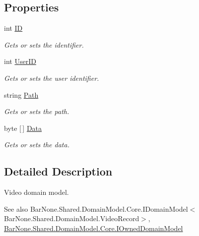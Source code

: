 \subsection*{Properties}
\begin{DoxyCompactItemize}
\item 
int \mbox{\hyperlink{class_bar_none_1_1_shared_1_1_domain_model_1_1_video_record_a89a53536488e59ff9dbd94803b42b68b}{ID}}
\begin{DoxyCompactList}\small\item\em Gets or sets the identifier. \end{DoxyCompactList}\item 
int \mbox{\hyperlink{class_bar_none_1_1_shared_1_1_domain_model_1_1_video_record_a36d21060cce09c7d4e4d116b8ec0ecf2}{User\+ID}}
\begin{DoxyCompactList}\small\item\em Gets or sets the user identifier. \end{DoxyCompactList}\item 
string \mbox{\hyperlink{class_bar_none_1_1_shared_1_1_domain_model_1_1_video_record_aedd2e8a4ce572281a56c6660425c636b}{Path}}
\begin{DoxyCompactList}\small\item\em Gets or sets the path. \end{DoxyCompactList}\item 
byte \mbox{[}$\,$\mbox{]} \mbox{\hyperlink{class_bar_none_1_1_shared_1_1_domain_model_1_1_video_record_a3d7000a648e9a2f222ec9383f820b2e7}{Data}}
\begin{DoxyCompactList}\small\item\em Gets or sets the data. \end{DoxyCompactList}\end{DoxyCompactItemize}


\subsection{Detailed Description}
Video domain model. 

\begin{DoxySeeAlso}{See also}
Bar\+None.\+Shared.\+Domain\+Model.\+Core.\+I\+Domain\+Model$<$\+Bar\+None.\+Shared.\+Domain\+Model.\+Video\+Record$>$, \mbox{\hyperlink{interface_bar_none_1_1_shared_1_1_domain_model_1_1_core_1_1_i_owned_domain_model}{Bar\+None.\+Shared.\+Domain\+Model.\+Core.\+I\+Owned\+Domain\+Model}}


\end{DoxySeeAlso}


